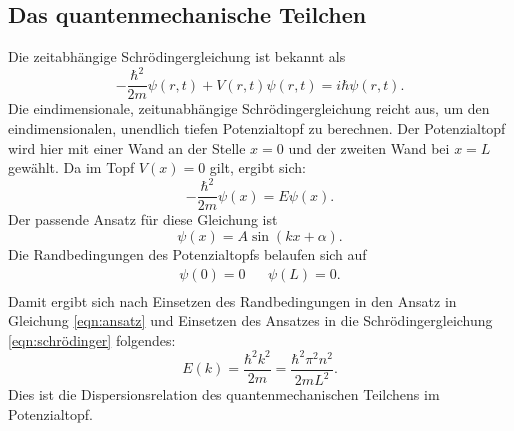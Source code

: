 \subsection{Das quantenmechanische Teilchen}
Die zeitabhängige Schrödingergleichung ist bekannt als
\begin{equation*}
  - \frac{ \hbar^2}{2 m} \psi(r, t) + V(r, t) \psi(r, t) = i \hbar \psi(r, t).
\end{equation*}
Die eindimensionale, zeitunabhängige Schrödingergleichung reicht aus, um den eindimensionalen, unendlich tiefen Potenzialtopf zu berechnen.
Der Potenzialtopf wird hier mit einer Wand an der Stelle $x=0$ und der zweiten Wand bei $x=L$ gewählt.
Da im Topf $V(x)=0$ gilt, ergibt sich:
\begin{equation}
  - \frac{ \hbar^2}{2 m} \psi(x) = E \psi(x).
  \label{eqn:schrödinger}
\end{equation}
Der passende Ansatz für diese Gleichung ist
\begin{equation}
  \psi(x)= A \sin{(kx+\alpha)}.
  \label{eqn:ansatz}
\end{equation}
Die Randbedingungen des Potenzialtopfs belaufen sich auf
\begin{align*}
    \psi(0)=0       && \psi(L)=0.\\
\end{align*}
Damit ergibt sich nach Einsetzen des Randbedingungen in den Ansatz in Gleichung \eqref{eqn:ansatz} und Einsetzen des Ansatzes in die Schrödingergleichung \eqref{eqn:schrödinger} folgendes:
\begin{equation}
  E(k) = \frac{\hbar^2 k^2}{2 m} = \frac{\hbar^2 \pi^2 n^2}{2 m L^2}.
  \label{eqn:dispersionqm}
\end{equation}
Dies ist die Dispersionsrelation des quantenmechanischen Teilchens im Potenzialtopf.

